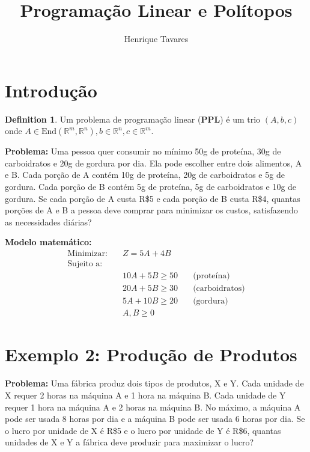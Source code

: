 \documentclass[]{article}
\title{Programação Linear e Polítopos}
\author{Henrique Tavares}
\theoremstyle{definition}
\newtheorem{definition}{Definition}[section]
\theoremstyle{definition}
\newcommand{\bb}{\mathbb}
\begin{document}
\maketitle

\begin{abstract}

\end{abstract}

\section{Introdução}

\begin{definition}
	Um problema de programação linear (\textbf{PPL}) é um trio $(A, b, c)$ onde $A \in \text{End}(\bb{R}^m, \bb{R}^n), b \in \bb{R}^n, c \in \bb{R}^m$.
\end{definition}



\textbf{Problema:} 
Uma pessoa quer consumir no mínimo 50g de proteína, 30g de carboidratos e 20g de gordura por dia. Ela pode escolher entre dois alimentos, A e B. Cada porção de A contém 10g de proteína, 20g de carboidratos e 5g de gordura. Cada porção de B contém 5g de proteína, 5g de carboidratos e 10g de gordura. Se cada porção de A custa R\$5 e cada porção de B custa R\$4, quantas porções de A e B a pessoa deve comprar para minimizar os custos, satisfazendo as necessidades diárias?

\textbf{Modelo matemático:}
\begin{align*}
\text{Minimizar:} \quad & Z = 5A + 4B \\
\text{Sujeito a:} \\
& 10A + 5B \geq 50 \quad & \text{(proteína)} \\
& 20A + 5B \geq 30 \quad & \text{(carboidratos)} \\
& 5A + 10B \geq 20 \quad & \text{(gordura)} \\
& A, B \geq 0
\end{align*}

\section*{Exemplo 2: Produção de Produtos}

\textbf{Problema:} 
Uma fábrica produz dois tipos de produtos, X e Y. Cada unidade de X requer 2 horas na máquina A e 1 hora na máquina B. Cada unidade de Y requer 1 hora na máquina A e 2 horas na máquina B. No máximo, a máquina A pode ser usada 8 horas por dia e a máquina B pode ser usada 6 horas por dia. Se o lucro por unidade de X é R\$5 e o lucro por unidade de Y é R\$6, quantas unidades de X e Y a fábrica deve produzir para maximizar o lucro?
\end{document}

